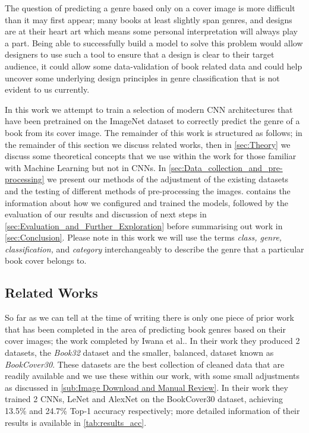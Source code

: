 \documentclass[12pt]{article}
\numberwithin{equation}{section}
\numberwithin{figure}{section}
\begin{document}
The question of predicting a genre based only on a cover image is more difficult than it may first appear; many books at least slightly span genres, and designs are at their heart art which means some personal interpretation will always play a part. Being able to successfully build a model to solve this problem would allow designers to use such a tool to ensure that a design is clear to their target audience, it could allow some data-validation of book related data and could help uncover some underlying design principles in genre classification that is not evident to us currently. 

In this work we attempt to train a selection of modern CNN architectures that have been pretrained on the ImageNet dataset to correctly predict the genre of a book from its cover image. The remainder of this work is structured as follows; in the remainder of this section we discuss related works, then in \cref{sec:Theory} we discuss some theoretical concepts that we use within the work for those familiar with Machine Learning but not in CNNs. In \cref{sec:Data_collection_and_pre-processing} we present our methods of the adjustment of the existing datasets and the testing of different methods of pre-processing the images.  contains the information about how we configured and trained the models, followed by the evaluation of our results and discussion of next steps in \cref{sec:Evaluation_and_Further_Exploration} before summarising out work in \cref{sec:Conclusion}. Please note in this work we will use the terms \emph{class, genre, classification,} and \emph{category} interchangeably to describe the genre that a particular book cover belongs to.

\subsection{Related Works} 
\label{sub:Related Works} 
So far as we can tell at the time of writing there is only one piece of prior work that has been completed in the area of predicting book genres based on their cover images; the work completed by Iwana et al.\cite{KenjiIwana}. In their work they produced 2 datasets, the \emph{Book32} dataset and the smaller, balanced, dataset known as \emph{BookCover30}. These datasets are the best collection of cleaned data that are readily available and we use these within our work, with some small adjustments as discussed in \cref{sub:Image Download and Manual Review}. In their work they trained 2 CNNs, LeNet and AlexNet on the BookCover30 dataset, achieving 13.5\% and 24.7\% Top-1 accuracy respectively; more detailed information of their results is available in \cref{tab:results_acc}.
\end{document}
